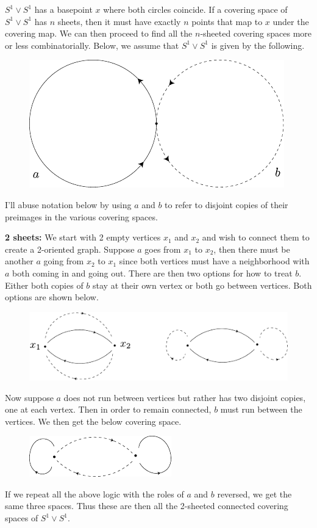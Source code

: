 \documentclass[twoside,10pt]{article}
\begin{document}
$S^{1}\vee S^{1}$ has a basepoint $x$ where both circles coincide. If a covering space of $S^{1}\vee S^{1}$ has $n$ sheets, then it must have exactly $n$ points that map to $x$ under the covering map. We can then proceed to find all the $n$-sheeted covering spaces more or less combinatorially. Below, we assume that $S^{1}\vee S^{1}$ is given by the following.
\begin{figure}[H]
	\centering
	\includegraphics[scale=1]{fig/10.pdf}
\end{figure}
I'll abuse notation below by using $a$ and $b$ to refer to disjoint copies of their preimages in the various covering spaces.

\textbf{2 sheets:}
We start with 2 empty vertices $x_1$ and $x_2$ and wish to connect them to create a 2-oriented graph. Suppose $a$ goes from $x_1$ to $x_2$, then there must be another $a$ going from $x_2$ to $x_1$ since both vertices must have a neighborhood with $a$ both coming in and going out. There are then two options for how to treat $b$. Either both copies of $b$ stay at their own vertex or both go between vertices. Both options are shown below.
\begin{figure}[H]
	\centering
	\includegraphics[scale=1.3]{fig/10b.pdf}
\end{figure}
Now suppose $a$ does not run between vertices but rather has two disjoint copies, one at each vertex. Then in order to remain connected, $b$ must run between the vertices. We then get the below covering space.
\begin{figure}[H]
	\centering
	\includegraphics[scale=1.3]{fig/10c.pdf}
\end{figure}
If we repeat all the above logic with the roles of $a$ and $b$ reversed, we get the same three spaces. Thus these are then all the 2-sheeted connected covering spaces of $S^{1}\vee S^{1}$.
\end{document}
